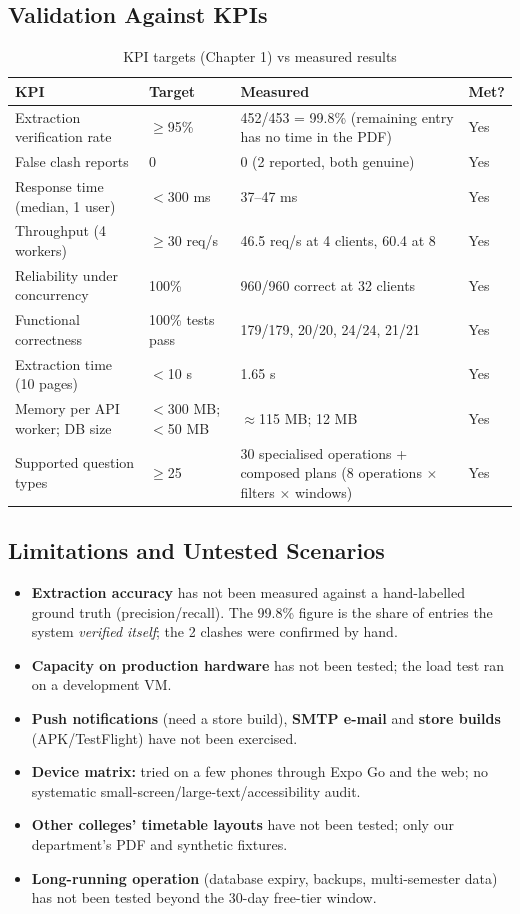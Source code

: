 \subsection{Validation Against KPIs}
\begin{table}[H]
\centering
\caption{KPI targets (Chapter 1) vs measured results}
\label{tab:kpivalid}
\small
\begin{tabularx}{\textwidth}{@{}p{3.6cm}p{2.6cm}Xp{1.4cm}@{}}
\toprule
\textbf{KPI} & \textbf{Target} & \textbf{Measured} & \textbf{Met?}\\
\midrule
Extraction verification rate & $\geq$95\% & 452/453 = 99.8\% (remaining entry has no time in the PDF) & Yes\\
False clash reports & 0 & 0 (2 reported, both genuine) & Yes\\
Response time (median, 1 user) & $<$300 ms & 37--47 ms & Yes\\
Throughput (4 workers) & $\geq$30 req/s & 46.5 req/s at 4 clients, 60.4 at 8 & Yes\\
Reliability under concurrency & 100\% & 960/960 correct at 32 clients & Yes\\
Functional correctness & 100\% tests pass & 179/179, 20/20, 24/24, 21/21 & Yes\\
Extraction time (10 pages) & $<$10 s & 1.65 s & Yes\\
Memory per API worker; DB size & $<$300 MB; $<$50 MB & $\approx$115 MB; 12 MB & Yes\\
Supported question types & $\geq$25 & 30 specialised operations + composed plans (8 operations $\times$ filters $\times$ windows) & Yes\\
\bottomrule
\end{tabularx}
\end{table}

\subsection{Limitations and Untested Scenarios}
\begin{itemize}
\item \textbf{Extraction accuracy} has not been measured against a hand-labelled ground truth
      (precision/recall). The 99.8\% figure is the share of entries the system \emph{verified itself};
      the 2 clashes were confirmed by hand.
\item \textbf{Capacity on production hardware} has not been tested; the load test ran on a development VM.
\item \textbf{Push notifications} (need a store build), \textbf{SMTP e-mail} and \textbf{store builds}
      (APK/TestFlight) have not been exercised.
\item \textbf{Device matrix:} tried on a few phones through Expo Go and the web; no systematic
      small-screen/large-text/accessibility audit.
\item \textbf{Other colleges' timetable layouts} have not been tested; only our department's PDF and
      synthetic fixtures.
\item \textbf{Long-running operation} (database expiry, backups, multi-semester data) has not been
      tested beyond the 30-day free-tier window.
\end{itemize}

\newpage
